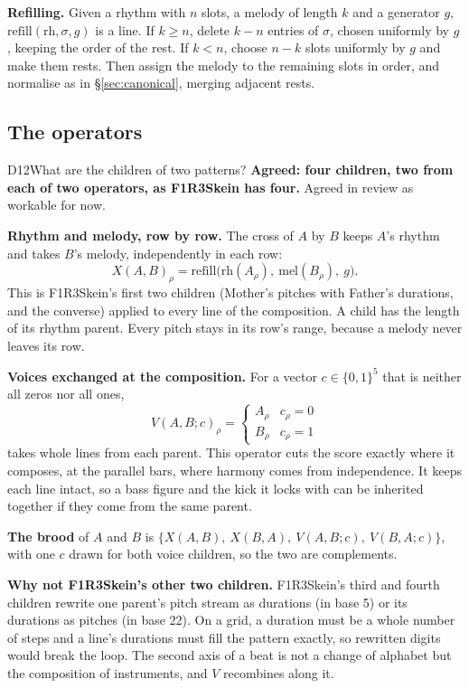\documentclass[11pt,a4paper]{article}
\begin{document}
\textbf{Refilling.} Given a rhythm with $n$ slots, a melody of length $k$ and a generator $g$,
$\mathrm{refill}(\mathrm{rh},\sigma,g)$ is a line. If $k\ge n$, delete $k-n$ entries of
$\sigma$, chosen uniformly by $g$, keeping the order of the rest. If $k<n$, choose $n-k$ slots
uniformly by $g$ and make them rests. Then assign the melody to the remaining slots in order,
and normalise as in \S\ref{sec:canonical}, merging adjacent rests.

\subsection{The operators}

\begin{decision}{D12}{What are the children of two patterns?}
\textbf{Agreed: four children, two from each of two operators, as F1R3Skein has four.}
Agreed in review as workable for now.

\textbf{Rhythm and melody, row by row.} The cross of $A$ by $B$ keeps $A$'s rhythm and takes
$B$'s melody, independently in each row:
\[
  X(A,B)_\rho=\mathrm{refill}\bigl(\mathrm{rh}(A_\rho),\ \mathrm{mel}(B_\rho),\ g\bigr).
\]
This is F1R3Skein's first two children (Mother's pitches with Father's durations, and the
converse) applied to every line of the composition. A child has the length of its rhythm
parent. Every pitch stays in its row's range, because a melody never leaves its row.

\textbf{Voices exchanged at the composition.} For a vector $c\in\{0,1\}^5$ that is neither all
zeros nor all ones,
\[
  V(A,B;c)_\rho=\begin{cases}A_\rho & c_\rho=0\\ B_\rho & c_\rho=1\end{cases}
\]
takes whole lines from each parent. This operator cuts the score exactly where it composes,
at the parallel bars, where harmony comes from independence. It keeps each line intact, so a
bass figure and the kick it locks with can be inherited together if they come from the same
parent.

\textbf{The brood} of $A$ and $B$ is
$\{X(A,B),\ X(B,A),\ V(A,B;c),\ V(B,A;c)\}$, with one $c$ drawn for both voice children, so
the two are complements.

\textbf{Why not F1R3Skein's other two children.} F1R3Skein's third and fourth children rewrite
one parent's pitch stream as durations (in base 5) or its durations as pitches (in base 22).
On a grid, a duration must be a whole number of steps and a line's durations must fill the
pattern exactly, so rewritten digits would break the loop. The second axis of a beat is not a
change of alphabet but the composition of instruments, and $V$ recombines along it.
\end{decision}
\end{document}
